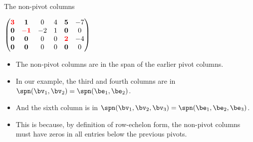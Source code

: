 \documentclass{beamer}
\begin{document}

\begin{frame}{The non-pivot columns}

$
\begin{pmatrix}
\textcolor{red}{\mathbf{3}} & \mathbf{1}                   &  0  & 4 & \mathbf{5}                  & -7 \\
\mathbf{0}                  & \textcolor{red}{\mathbf{-1}} & -2  & 1 & \mathbf{0}                  & 0  \\
\mathbf{0}                  & \mathbf{0}                   &  0  & 0 & \textcolor{red}{\mathbf{2}} & -4 \\
\mathbf{0}                  & \mathbf{0}                   &  0  & 0 & \mathbf{0}                  & 0  \\
\end{pmatrix}
$
\begin{itemize}
\item The non-pivot columns are in the span of the earlier pivot columns.
\item In our example, the third and fourth columns are in $\spn(\bv_1,\bv_2) = \spn(\be_1,\be_2)$.
\item And the sixth column is in  $\spn(\bv_1,\bv_2,\bv_3) = \spn(\be_1,\be_2,\be_3)$.
\item This is because, by definition of row-echelon form, the non-pivot columns must have zeros
in all entries below the previous pivots.
\end{itemize}

\end{frame}

\end{document}
